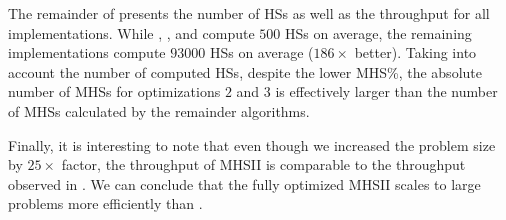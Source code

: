 The remainder of  presents the number of
\acp{HS} as well as the throughput for all implementations.
%
While , , and  compute
$500$ \acp{HS} on average, the remaining implementations compute
$93000$ \acp{HS} on average ($186\times$ better).
%
Taking into account the number of computed \acp{HS}, despite the lower
\ac{MHS}\%, the absolute number of \acp{MHS} for optimizations $2$ and
$3$ is effectively larger than the number of \acp{MHS} calculated by
the remainder algorithms.


Finally, it is interesting to note that even though we increased the
problem size by $25\times$ factor, the throughput of \ac{MHSII} is
comparable to the throughput observed in
.
%
We can conclude that the fully optimized \ac{MHSII} scales to large
problems more efficiently than \staccato{}.
